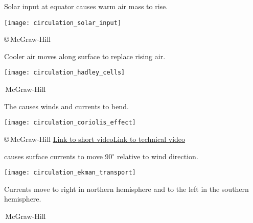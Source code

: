 \documentclass[t]{beamer}
\begin{document}
\begin{frame}[t]{Solar input at equator causes warm air mass to rise.}
	\begin{center}
		\texttt{[image: circulation\_solar\_input]}
	\end{center}

	\vfilll

	\hfill \tiny \copyright\,McGraw-Hill
\end{frame}
%
\begin{frame}[t]{Cooler air moves along surface to replace rising air.}

	\begin{center}
		\texttt{[image: circulation\_hadley\_cells]}
	\end{center}

	\vfilll

	\hfill \tiny \textcopyright\,McGraw-Hill
\end{frame}
%
\begin{frame}[t]{The  causes winds and currents to bend.}

	\begin{center}
		\texttt{[image: circulation\_coriolis\_effect]}
	\end{center}

	\vfilll

	\tiny \copyright\,McGraw-Hill \hfill \href{https://www.youtube.com/watch?v=HIyBpi7B-dE}{Link to short video}\hfill \href{https://youtu.be/aeY9tY9vKgs}{Link to technical video}%
\end{frame}
%
\begin{frame}[t]{ causes surface currents to move 90$^\circ$ relative to wind direction.}
	\begin{multicols}{2}

		\texttt{[image: circulation\_ekman\_transport]}

	\columnbreak

		\hangpara\parbox[t]{0.45\textwidth}{Currents move to right in northern hemisphere and to the left in the southern hemisphere.}
	
	
	
	\end{multicols}

	\vfilll

	\hfill \tiny \textcopyright\,McGraw-Hill

\end{frame}
\end{document}
